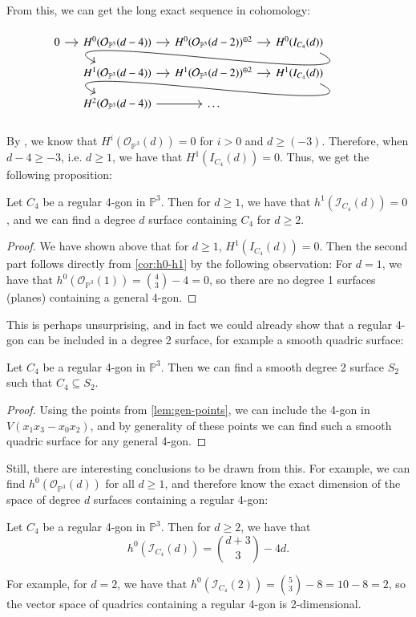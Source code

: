 From this, we can get the long exact sequence in cohomology:
\[
  \begin{tikzcd}[sep=small]
    0 \ar[r]
    & H^0(\mathcal{O}_{\mathbb{P}^3}(d-4)) \ar[r]
    & H^0(\mathcal{O}_{\mathbb{P}^3}(d-2))^{\oplus 2} \ar[r]
    & H^0(I_{C_4}(d)) \ar[controls={+(3,-1.5) and +(-3,1.5)}]{dll} \\
    {}
    & H^1(\mathcal{O}_{\mathbb{P}^3}(d-4)) \ar[r]
    & H^1(\mathcal{O}_{\mathbb{P}^3}(d-2))^{\oplus 2} \ar[r]
    & H^1(I_{C_4}(d)) \ar[controls={+(3,-1.5) and +(-3,1.5)}]{dll} \\
    {}
    & H^2(\mathcal{O}_{\mathbb{P}^3}(d-4)) \ar[r]
    & \dots
  \end{tikzcd}
\]

By \cite[Theorem 20.23]{EO25}, we know that $H^i(\mathcal{O}_{\mathbb{P}^3}(d)) = 0$ for $i > 0$ and $d \geq (-3)$. Therefore, when $d-4 \geq -3$, i.e. $d \geq 1$, we have that $H^1(I_{C_4}(d)) = 0$. Thus, we get the following proposition:

\begin{proposition}
    Let $C_4$ be a regular 4-gon in $\mathbb{P}^3$. Then for $d \geq 1$, we have that $h^1(\mathcal{I}_{C_4}(d)) = 0$, and we can find a degree $d$ surface containing $C_4$ for $d \geq 2$.
\end{proposition}
\begin{proof}
    We have shown above that for $d \geq 1$, $H^1(I_{C_4}(d)) = 0$. Then the second part follows directly from \cref{cor:h0-h1} by the following observation: For $d=1$, we have that $h^0(\mathcal{O}_{\mathbb{P}^3}(1)) = \binom{4}{3}-4 = 0$, so there are no degree 1 surfaces (planes) containing a general 4-gon.
\end{proof}

This is perhaps unsurprising, and in fact we could already show that a regular 4-gon can be included in a degree 2 surface, for example a smooth quadric surface:
\begin{corollary}\label{cor:4-gon}
    Let $C_4$ be a regular 4-gon in $\mathbb{P}^3$. Then we can find a smooth degree 2 surface $S_2$ such that $C_4 \subseteq S_2$.
\end{corollary}
\begin{proof}
    Using the points from \cref{lem:gen-points}, we can include the 4-gon in $V(x_1x_3-x_0x_2)$, and by generality of these points we can find such a smooth quadric surface for any general 4-gon.
\end{proof}

Still, there are interesting conclusions to be drawn from this. For example, we can find $h^0(\mathcal{O}_{\mathbb{P}^3}(d))$ for all $d \geq 1$, and therefore know the exact dimension of the space of degree $d$ surfaces containing a regular 4-gon:
\begin{corollary}
    Let $C_4$ be a regular 4-gon in $\mathbb{P}^3$. Then for $d \geq 2$, we have that
    \[h^0(\mathcal{I}_{C_4}(d)) = \binom{d+3}{3} - 4d.\]
\end{corollary}
For example, for $d=2$, we have that $h^0(\mathcal{I}_{C_4}(2)) = \binom{5}{3} - 8 = 10 - 8 = 2$, so the vector space of quadrics containing a regular 4-gon is 2-dimensional.

